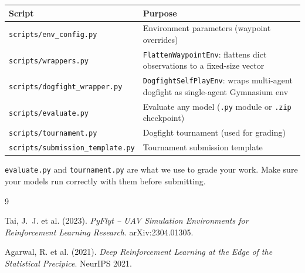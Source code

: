 \documentclass[11pt,a4paper]{article}
\begin{document}
\begin{table}[H]
\centering
\begin{tabularx}{\textwidth}{lX}
\toprule
\textbf{Script} & \textbf{Purpose} \\
\midrule
\texttt{scripts/env\_config.py} & Environment parameters (waypoint overrides) \\
\texttt{scripts/wrappers.py} & \texttt{FlattenWaypointEnv}: flattens dict observations to a fixed-size vector \\
\texttt{scripts/dogfight\_wrapper.py} & \texttt{DogfightSelfPlayEnv}: wraps multi-agent dogfight as single-agent Gymnasium env \\
\texttt{scripts/evaluate.py} & Evaluate any model (\texttt{.py} module or \texttt{.zip} checkpoint) \\
\texttt{scripts/tournament.py} & Dogfight tournament (used for grading) \\
\texttt{scripts/submission\_template.py} & Tournament submission template \\
\bottomrule
\end{tabularx}
\end{table}

\texttt{evaluate.py} and \texttt{tournament.py} are what we use to grade your work. Make sure your models run correctly with them before submitting.

\newpage

\begin{thebibliography}{9}

Tai, J.~J. et al. (2023).
\textit{PyFlyt -- UAV Simulation Environments for Reinforcement Learning Research}.
arXiv:2304.01305.

Agarwal, R. et al. (2021).
\textit{Deep Reinforcement Learning at the Edge of the Statistical Precipice}.
NeurIPS 2021.

\end{thebibliography}
\end{document}
